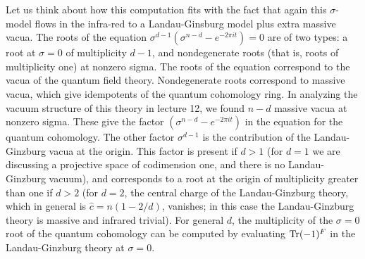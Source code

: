 Let us think about how this computation fits with the fact that again
this $\sigma$-model flows in the infra-red to a Landau-Ginsburg model
plus extra massive vacua.
The roots of the equation $\sigma^{d-1}(\sigma^{n-d}-e^{-2\pi i t})=0$
are of two types: a root at $\sigma=0$ of multiplicity $d-1$,
and nondegenerate roots (that is, roots of multiplicity one) at
nonzero sigma.
The roots of the equation correspond to the vacua of the quantum field
theory.  Nondegenerate roots correspond to massive vacua, which give
idempotents of the quantum cohomology ring.
In analyzing the vacuum structure of this theory in lecture 12, we found
$n-d$ massive vacua at nonzero sigma.  These give the factor
$(\sigma^{n-d}-e^{-2\pi i t})$ in the equation for the quantum cohomology.
The other factor $\sigma^{d-1}$ is the contribution of the Landau-Ginzburg
vacua at the origin.  This factor is present if $d>1$ (for $d=1$
we are discussing a projective space of codimension one, and there is
no Landau-Ginzburg vacuum), and corresponds to a root at the origin
of multiplicity greater than one if $d>2$ (for $d=2$, the central
charge of the Landau-Ginzburg theory, which in general is $\widehat
c=n(1-2/d)$,
vanishes; in this case the Landau-Ginzburg theory is massive and infrared
trivial).  For general $d$, the multiplicity of the $\sigma=0$
root of the quantum cohomology can be computed by evaluating $\mathop{\rm Tr}\nolimits(-1)^F$
in the Landau-Ginzburg theory at $\sigma=0$.






